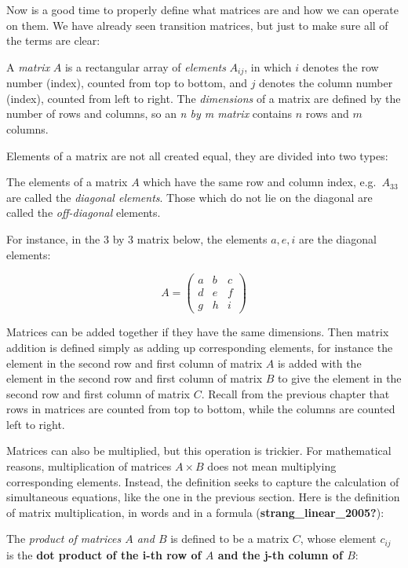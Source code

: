 \documentclass[
  letterpaper,
  DIV=11,
  numbers=noendperiod]{scrreprt}
\begin{document}
Now is a good time to properly define what matrices are and how we can
operate on them. We have already seen transition matrices, but just to
make sure all of the terms are clear:

A \emph{matrix} \(A\) is a rectangular array of \emph{elements}
\(A_{ij}\), in which \(i\) denotes the row number (index), counted from
top to bottom, and \(j\) denotes the column number (index), counted from
left to right. The \emph{dimensions} of a matrix are defined by the
number of rows and columns, so an \emph{n by m matrix} contains \(n\)
rows and \(m\) columns.

Elements of a matrix are not all created equal, they are divided into
two types:

The elements of a matrix \(A\) which have the same row and column index,
e.g.~\(A_{33}\) are called the \emph{diagonal elements}. Those which do
not lie on the diagonal are called the \emph{off-diagonal} elements.

For instance, in the 3 by 3 matrix below, the elements \(a, e, i\) are
the diagonal elements:

\[
A = \left(\begin{array}{ccc}a & b & c \\d & e & f \\g & h & i\end{array}\right)
\]

Matrices can be added together if they have the same dimensions. Then
matrix addition is defined simply as adding up corresponding elements,
for instance the element in the second row and first column of matrix
\(A\) is added with the element in the second row and first column of
matrix \(B\) to give the element in the second row and first column of
matrix \(C\). Recall from the previous chapter that rows in matrices are
counted from top to bottom, while the columns are counted left to right.

Matrices can also be multiplied, but this operation is trickier. For
mathematical reasons, multiplication of matrices \(A \times B\) does not
mean multiplying corresponding elements. Instead, the definition seeks
to capture the calculation of simultaneous equations, like the one in
the previous section. Here is the definition of matrix multiplication,
in words and in a formula (\textbf{strang\_linear\_2005?}):

The \emph{product of matrices \(A\) and \(B\)} is defined to be a matrix
\(C\), whose element \(c_{ij}\) is the \textbf{dot product of the i-th
row of \(A\) and the j-th column of \(B\)}:
\end{document}
